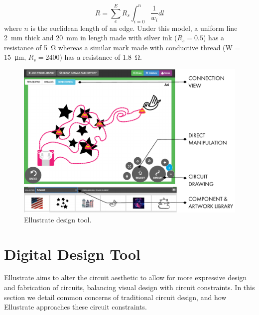 \documentclass{sigchi}
\begin{document}
    \begin{equation}
        R =  \sum^{E}_e R_s \int_{i=0}^{n}  \frac{1}{w_i} dl
    \label{eq:resistance}
    \end{equation} 
    where $n$ is the euclidean length of an edge. Under this model, a uniform line \SI{2}{\milli\metre} thick and \SI{20}{\milli\metre} in length made with silver ink ($R_s = 0.5$) has a resistance of \SI{5}{\ohm} whereas a similar mark made with conductive thread (W = \SI{15}{\micro\metre}, $R_s = 2400$) has a resistance of \SI{1.8}{\ohm}.
    
        
    

\begin{figure}[t]
\centering
\includegraphics[width=1.0\columnwidth]{figures/designtool.pdf}
\caption{Ellustrate design tool. }
\label{fig:design_tool}
\end{figure}
\section{Digital Design Tool}
    Ellustrate aims to alter the circuit aesthetic to allow for more expressive design and fabrication of circuits, balancing visual design with circuit constraints. In this section we detail common concerns of traditional circuit design, and how Ellustrate approaches these circuit constraints. 
             
             
\end{document}
